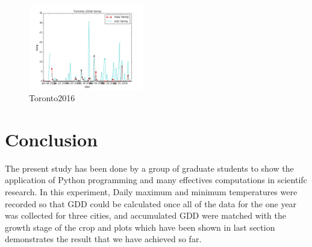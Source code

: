 \documentclass[DIV=calc, paper=a4, fontsize=11pt, twocolumn]{scrartcl}
\begin{document}
\begin{figure}[h!]
	\centering
	\includegraphics[width=50mm]{../output/plot_images/Toronto_2016.png}
	\caption{Toronto2016}
	\label{fig:method6}
\end{figure}


\section{Conclusion}
The present study has been done by a group of graduate students to show the application of Python programming and many effectives computations in scientifc research. In this experiment, Daily maximum and minimum temperatures were recorded so that GDD could be calculated once all of the data for the one year was collected for three cities, and accumulated GDD were matched with the growth stage of the crop and plots which have been shown in last section demonstrates the result that we have achieved so far.

\end{document}
